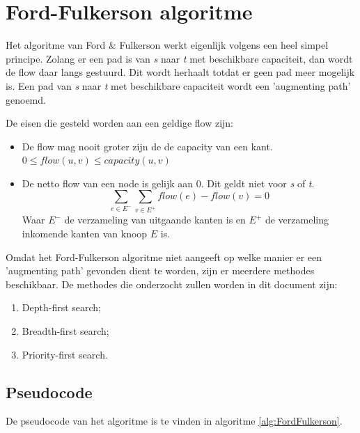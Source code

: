 \section{Ford-Fulkerson algoritme}
\label{sec:fordfulkerson}

Het algoritme van Ford \& Fulkerson werkt eigenlijk volgens een heel simpel principe. Zolang er een pad is van \textit{s} naar \textit{t} met beschikbare capaciteit, dan wordt de flow daar langs gestuurd. Dit wordt herhaalt totdat er geen pad meer mogelijk is. Een pad van \textit{s} naar \textit{t} met beschikbare capaciteit wordt een 'augmenting path' genoemd.

De eisen die gesteld worden aan een geldige flow zijn:

\begin{itemize}
	\item De flow mag nooit groter zijn de de capacity van een kant. $0 \leq flow(u,v) \leq capacity(u,v)$
	\item De netto flow van een node is gelijk aan 0. Dit geldt niet voor \textit{s} of \textit{t}.$$\sum_{e \in E^-}\sum_{v \in E^+}{flow(e)-flow(v)} = 0$$
Waar $E^-$ de verzameling van uitgaande kanten is en $E^+$ de verzameling inkomende kanten van knoop $E$ is.
\end{itemize}

Omdat het Ford-Fulkerson algoritme niet aangeeft op welke manier er een 'augmenting path' gevonden dient te worden, zijn er meerdere methodes beschikbaar.
De methodes die onderzocht zullen worden in dit document zijn:

\begin{enumerate}
	\item Depth-first search;
	\item Breadth-first search;
	\item Priority-first search.
\end{enumerate}

\subsection{Pseudocode}

De pseudocode van het algoritme is te vinden in algoritme \ref{alg:FordFulkerson}.

